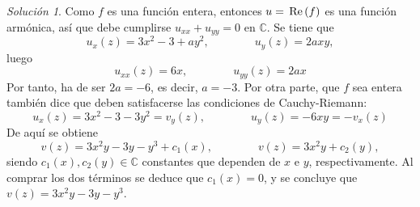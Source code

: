 \documentclass[11pt]{report}
\newcommand{\C}{\mathbb C}
\newcommand{\pars}[1]{\left( #1 \right)} %
\renewcommand{\Re}[1]{\,\textup{Re}\pars{#1}}
\theoremstyle{remark}
\newtheorem*{resolution}{Solución}
\begin{document}
\begin{resolution}
Como $f$ es una función entera, entonces $u = \Re{f}$ es una función armónica, así que debe cumplirse $u_{xx}+u_{yy} = 0$ en $\C$. Se tiene que
\[u_x(z) = 3x^2-3+ay^2, \qquad \qquad u_y(z) = 2axy,\]
luego
\[u_{xx}(z)=6x, \qquad \qquad u_{yy}(z) = 2ax\]
Por tanto, ha de ser $2a = -6$, es decir, $a = -3$. Por otra parte, que $f$ sea entera también dice que deben satisfacerse las condiciones de Cauchy-Riemann:
\[u_x(z) = 3x^2-3-3y^2 = v_y(z), \qquad \qquad u_y(z) = -6xy = -v_x(z)\]
De aquí se obtiene
\[v(z) = 3x^2y-3y-y^3+c_1(x), \qquad \qquad v(z) =3x^2y+c_2(y),\]
siendo $c_1(x), c_2(y) \in \C$ constantes que dependen de $x$ e $y$, respectivamente. Al comprar los dos términos se deduce que $c_1(x) = 0$, y se concluye que $v(z) = 3x^2y-3y-y^3$.
\end{resolution}
\end{document}
